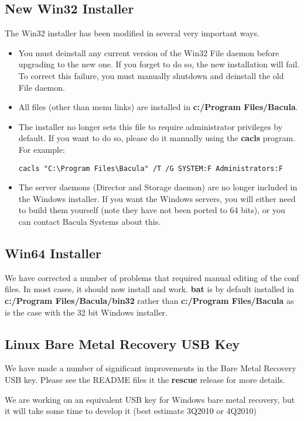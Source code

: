 \subsection{New Win32 Installer}
The Win32 installer has been modified in several very important
ways.  
\begin{itemize}
\item You must deinstall any current version of the
Win32 File daemon before upgrading to the new one. 
If you forget to do so, the new installation will fail.
To correct this failure, you must manually shutdown 
and deinstall the old File daemon. 
\item All files (other than menu links) are installed
in {\bf c:/Program Files/Bacula}.  
\item The installer no longer sets this
file to require administrator privileges by default. If you want
to do so, please do it manually using the {\bf cacls} program.
For example:
\begin{verbatim}
cacls "C:\Program Files\Bacula" /T /G SYSTEM:F Administrators:F
\end{verbatim}
\item The server daemons (Director and Storage daemon) are
no longer included in the Windows installer.  If you want the
Windows servers, you will either need to build them yourself (note
they have not been ported to 64 bits), or you can contact 
Bacula Systems about this.
\end{itemize}

\subsection{Win64 Installer}
We have corrected a number of problems that required manual
editing of the conf files.  In most cases, it should now
install and work.  {\bf bat} is by default installed in
{\bf c:/Program Files/Bacula/bin32} rather than
{\bf c:/Program Files/Bacula} as is the case with the 32
bit Windows installer.

\subsection{Linux Bare Metal Recovery USB Key}
We have made a number of significant improvements in the
Bare Metal Recovery USB key.  Please see the README files
it the {\bf rescue} release for more details.  

We are working on an equivalent USB key for Windows bare
metal recovery, but it will take some time to develop it (best
estimate 3Q2010 or 4Q2010)


